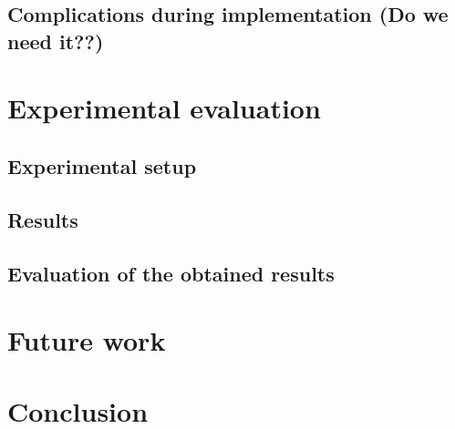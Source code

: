 \section{Complications during implementation (Do we need it??)}

\chapter{Experimental evaluation}
\label{06:chapter:title}

\section{Experimental setup}
\section{Results}
\section{Evaluation of the obtained results}

\chapter{Future work}
\label{07:chapter:title}


\chapter{Conclusion}
\label{08:chapter:title}
